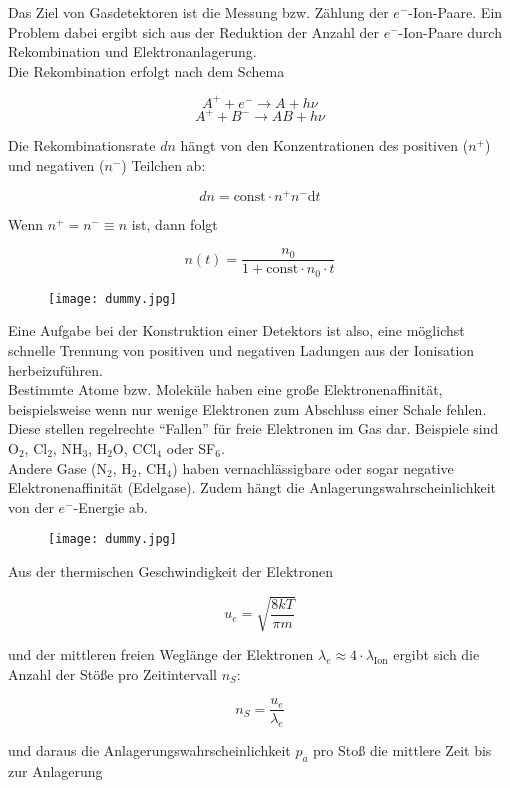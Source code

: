 Das Ziel von Gasdetektoren ist die Messung bzw. Zählung der $e^-$-Ion-Paare. Ein Problem dabei
ergibt sich aus der Reduktion der Anzahl der $e^-$-Ion-Paare durch Rekombination und
Elektronanlagerung.
\\
Die Rekombination erfolgt nach dem Schema

\[A^+ + e^- \longrightarrow A + h\nu \]
\[A^+ + B^- \longrightarrow AB + h\nu  \]

Die Rekombinationsrate $dn$ hängt von den Konzentrationen des positiven ($n^+$) und negativen
($n^-$) Teilchen ab:

\[dn= \text{const}\cdot n^+ n^- \mathrm{d}t \]

Wenn $n^+=n^-\equiv n$ ist, dann folgt

\[n(t) = \frac{n_0}{1+\text{const}\cdot n_0\cdot t}  \]

\begin{figure}[H]
	\centering
	\texttt{[image: dummy.jpg]}
\end{figure}

Eine Aufgabe bei der Konstruktion einer Detektors ist also, eine möglichst schnelle Trennung von
positiven und negativen Ladungen aus der Ionisation herbeizuführen.
\\
Bestimmte Atome bzw. Moleküle haben eine große Elektronenaffinität, beispielsweise wenn nur wenige
Elektronen zum Abschluss einer Schale fehlen. Diese stellen regelrechte "`Fallen"' für
freie Elektronen im Gas dar. Beispiele sind O$_2$, Cl$_2$, NH$_3$, H$_2$O, CCl$_4$ oder SF$_6$.
\\
Andere Gase (N$_2$, H$_2$, CH$_4$) haben vernachlässigbare oder sogar negative
Elektronenaffinität (Edelgase). Zudem hängt die Anlagerungswahrscheinlichkeit von der $e^-$-Energie
ab.

\begin{figure}[H]
	\centering
	\texttt{[image: dummy.jpg]}
\end{figure}

Aus der thermischen Geschwindigkeit der Elektronen 

\[u_e = \sqrt{\frac{8kT}{\pi m}}  \]

und der mittleren freien Weglänge der Elektronen $\lambda_e \approx 4\cdot \lambda_{\text{Ion}}$
ergibt sich die Anzahl der Stöße pro Zeitintervall $n_S$:

\[ n_S = \frac{u_e}{\lambda_e}  \]

und daraus die Anlagerungswahrscheinlichkeit $p_a$ pro Stoß die mittlere Zeit bis zur Anlagerung

